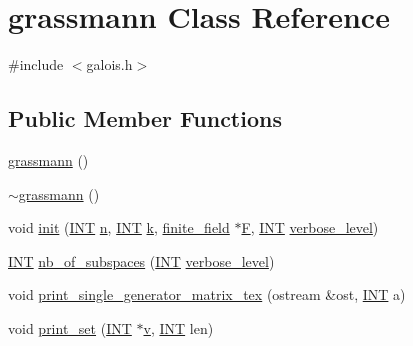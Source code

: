 \hypertarget{classgrassmann}{}\section{grassmann Class Reference}
\label{classgrassmann}


{\ttfamily \#include $<$galois.\+h$>$}

\subsection*{Public Member Functions}
\begin{DoxyCompactItemize}
\item 
\mbox{\hyperlink{classgrassmann_a252a85d3b74eb4fbd5771f4152a5f272}{grassmann}} ()
\item 
\mbox{\hyperlink{classgrassmann_a369d95c437675f075f643b7e63a2a3a5}{$\sim$grassmann}} ()
\item 
void \mbox{\hyperlink{classgrassmann_a2e8cf7b9f203254493d7c2607c17d498}{init}} (\mbox{\hyperlink{galois_8h_a09fddde158a3a20bd2dcadb609de11dc}{I\+NT}} \mbox{\hyperlink{classgrassmann_a2559679fc4552f90f84aa3545c7834b0}{n}}, \mbox{\hyperlink{galois_8h_a09fddde158a3a20bd2dcadb609de11dc}{I\+NT}} \mbox{\hyperlink{classgrassmann_a00e5ae1bd671fb4666379f7b355db11f}{k}}, \mbox{\hyperlink{classfinite__field}{finite\+\_\+field}} $\ast$\mbox{\hyperlink{classgrassmann_ada0f668336cc7643fd7597d9099c3314}{F}}, \mbox{\hyperlink{galois_8h_a09fddde158a3a20bd2dcadb609de11dc}{I\+NT}} \mbox{\hyperlink{simeon_8_c_a818073fbcc2f439e7c56952f67386122}{verbose\+\_\+level}})
\item 
\mbox{\hyperlink{galois_8h_a09fddde158a3a20bd2dcadb609de11dc}{I\+NT}} \mbox{\hyperlink{classgrassmann_aba8f53731d3cdd10147559e2a7eee452}{nb\+\_\+of\+\_\+subspaces}} (\mbox{\hyperlink{galois_8h_a09fddde158a3a20bd2dcadb609de11dc}{I\+NT}} \mbox{\hyperlink{simeon_8_c_a818073fbcc2f439e7c56952f67386122}{verbose\+\_\+level}})
\item 
void \mbox{\hyperlink{classgrassmann_aac233f873cf4090359aab75e9604a573}{print\+\_\+single\+\_\+generator\+\_\+matrix\+\_\+tex}} (ostream \&ost, \mbox{\hyperlink{galois_8h_a09fddde158a3a20bd2dcadb609de11dc}{I\+NT}} a)
\item 
void \mbox{\hyperlink{classgrassmann_aa15444bcee49f332c44023d44b04d87b}{print\+\_\+set}} (\mbox{\hyperlink{galois_8h_a09fddde158a3a20bd2dcadb609de11dc}{I\+NT}} $\ast$\mbox{\hyperlink{simeon_8_c_aeb3f3030944801b163bc3b829a7f6710}{v}}, \mbox{\hyperlink{galois_8h_a09fddde158a3a20bd2dcadb609de11dc}{I\+NT}} len)

\end{DoxyCompactItemize}
